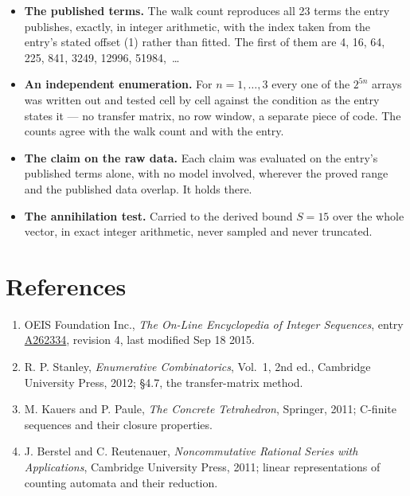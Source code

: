 \documentclass[11pt]{article}
\theoremstyle{definition}
\begin{document}
\begin{itemize}

\item {\bfseries The published terms.} The walk count reproduces all 23 terms the entry publishes, exactly, in integer arithmetic, with the index taken from the entry's stated offset (1) rather than fitted. The first of them are 4, 16, 64, 225, 841, 3249, 12996, 51984,~\dots

\item {\bfseries An independent enumeration.} For $n = 1,\dots,3$ every one of the $2^{5n}$ arrays was written out and tested cell by cell against the condition as the entry states it --- no transfer matrix, no row window, a separate piece of code. The counts agree with the walk count and with the entry.

\item {\bfseries The claim on the raw data.} Each claim was evaluated on the entry's published terms alone, with no model involved, wherever the proved range and the published data overlap. It holds there.

\item {\bfseries The annihilation test.} Carried to the derived bound $S = 15$ over the whole vector, in exact integer arithmetic, never sampled and never truncated.

\end{itemize}

\section{References}

\begin{enumerate}

\item OEIS Foundation Inc., \emph{The On-Line Encyclopedia of Integer Sequences}, entry \href{https://oeis.org/A262334}{A262334}, revision 4, last modified Sep 18 2015.

\item R. P. Stanley, \emph{Enumerative Combinatorics}, Vol.~1, 2nd ed., Cambridge University Press, 2012; \S4.7, the transfer-matrix method.

\item M. Kauers and P. Paule, \emph{The Concrete Tetrahedron}, Springer, 2011; C-finite sequences and their closure properties.

\item J. Berstel and C. Reutenauer, \emph{Noncommutative Rational Series with Applications}, Cambridge University Press, 2011; linear representations of counting automata and their reduction.

\end{enumerate}
\end{document}
